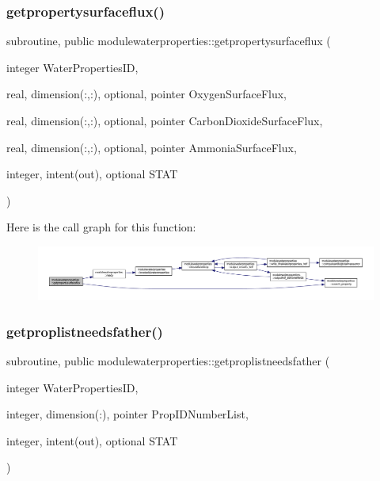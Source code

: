 \subsubsection{\texorpdfstring{getpropertysurfaceflux()}{getpropertysurfaceflux()}}
{\footnotesize\ttfamily subroutine, public modulewaterproperties\+::getpropertysurfaceflux (\begin{DoxyParamCaption}\item[{integer}]{Water\+Properties\+ID,  }\item[{real, dimension(\+:,\+:), optional, pointer}]{Oxygen\+Surface\+Flux,  }\item[{real, dimension(\+:,\+:), optional, pointer}]{Carbon\+Dioxide\+Surface\+Flux,  }\item[{real, dimension(\+:,\+:), optional, pointer}]{Ammonia\+Surface\+Flux,  }\item[{integer, intent(out), optional}]{S\+T\+AT }\end{DoxyParamCaption})}

Here is the call graph for this function\+:\nopagebreak
\begin{figure}[H]
\begin{center}
\leavevmode
\includegraphics[width=350pt]{namespacemodulewaterproperties_af2c46d3b317e3d23dca87bea01a118fa_cgraph}
\end{center}
\end{figure}
\mbox{\label{namespacemodulewaterproperties_ac8bf28f0c63fb495a5f90cf0d6563ae6}} 
\subsubsection{\texorpdfstring{getproplistneedsfather()}{getproplistneedsfather()}}
{\footnotesize\ttfamily subroutine, public modulewaterproperties\+::getproplistneedsfather (\begin{DoxyParamCaption}\item[{integer}]{Water\+Properties\+ID,  }\item[{integer, dimension(\+:), pointer}]{Prop\+I\+D\+Number\+List,  }\item[{integer, intent(out), optional}]{S\+T\+AT }\end{DoxyParamCaption})}

